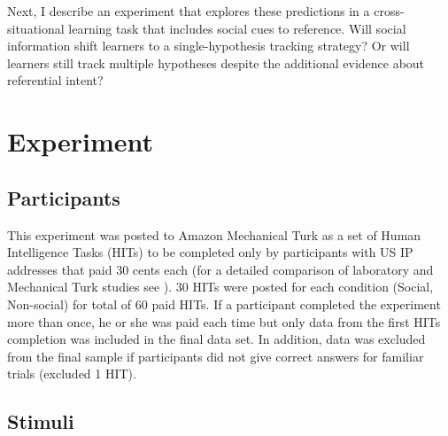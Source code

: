 \documentclass[10pt,letterpaper]{article}
\begin{document}
Next, I describe an experiment that explores these predictions in a cross-situational learning task that includes social cues to reference. Will social information shift learners to a single-hypothesis tracking strategy? Or will learners still track multiple hypotheses despite the additional evidence about referential intent?

\section{Experiment}

\subsection{Participants}

This experiment was posted to Amazon Mechanical Turk as a set of
Human Intelligence Tasks (HITs) to be completed only by participants with US IP
addresses that paid 30 cents each (for a detailed comparison of laboratory and Mechanical
Turk studies see ). 30 HITs were posted for each
condition (Social, Non-social) for total of 60 paid HITs. If a participant
completed the experiment more than once, he or she was paid each time but only data
from the first HITs completion was included in the final data set. In
addition, data was excluded from the final sample if participants did not give correct
answers for familiar trials (excluded 1 HIT).

\subsection{Stimuli}
\end{document}
